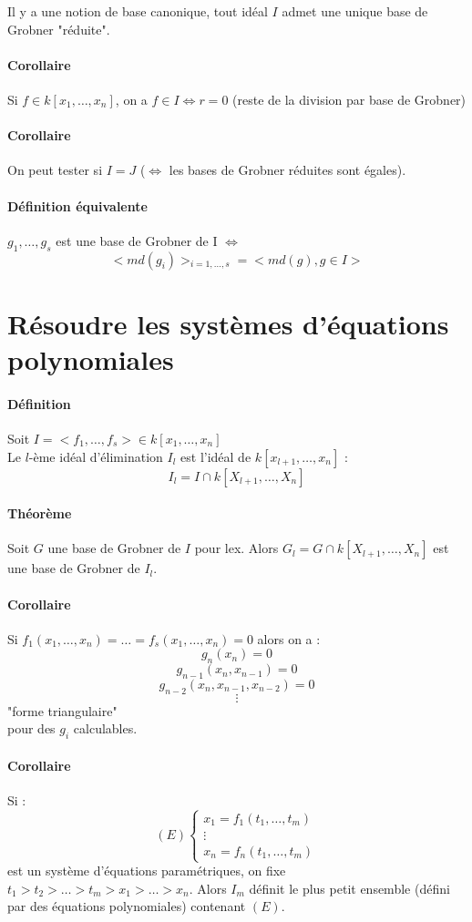 \documentclass[12pt,a4paper]{report}
\begin{document}
Il y a une notion de base canonique, tout idéal $I$ admet une unique base de Grobner "réduite".
\paragraph{Corollaire\\}
Si $f \in k[x_1,\ldots,x_n]$, on a $f \in I \Leftrightarrow r=0$ (reste de la division par base de Grobner)
\paragraph{Corollaire\\}
On peut tester si $I=J$ ($\Leftrightarrow$ les bases de Grobner réduites sont égales).
\paragraph{Définition équivalente\\}
$g_1,\ldots,g_s$ est une base de Grobner de I $\Leftrightarrow $
$$<md(g_i)>_{i=1,\ldots,s} = <md(g),g\in I>$$
\section{Résoudre les systèmes d'équations polynomiales}
\paragraph{Définition\\}
Soit $I = < f_1,\ldots,f_s> \in k[x_1,\ldots,x_n]$\\
Le $l$-ème idéal d'élimination $I_l$ est l'idéal de $k[x_{l+1},\ldots,x_n]$ :
$$ I_l = I \cap k[X_{l+1},\ldots,X_n] $$
\paragraph{Théorème\\}
Soit $G$ une base de Grobner de $I$ pour lex. Alors $G_l = G \cap  k[X_{l+1},\ldots,X_n]$ est une base de Grobner de $I_l$.
\paragraph{Corollaire\\}
Si $f_1(x_1,\ldots,x_n) = \ldots = f_s(x_1,\ldots,x_n) = 0$ alors on a :
$$ g_n(x_n) = 0 $$
$$ g_{n-1}(x_n,x_{n-1})=0 $$
$$ g_{n-2}(x_n,x_{n-1},x_{n-2})=0$$
$$ \vdots $$
"forme triangulaire"\\
pour des $g_i$ calculables.
\paragraph{Corollaire\\}
Si :
$$ (E) \left\{ \begin{array}{c}
x_1 = f_1(t_1,\ldots,t_m)\\
\vdots \\
x_n = f_n(t_1,\ldots,t_m) \end{array}\right. $$
est un système d'équations paramétriques, on fixe $t_1 > t_2 > \ldots > t_m > x_1 > \ldots > x_n $. Alors $I_m$ définit le plus petit ensemble (défini par des équations polynomiales) contenant $(E)$.
\end{document}
